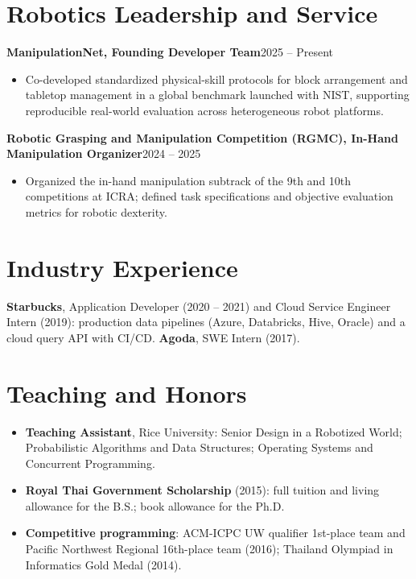 \documentclass[10pt,letterpaper]{article}
\newcommand{\entry}[2]{\textbf{#1}\hfill #2\par}
\begin{document}
\section{Robotics Leadership and Service}
\entry{ManipulationNet, Founding Developer Team}{2025 -- Present}
\begin{itemize}
  \item Co-developed standardized physical-skill protocols for block arrangement and tabletop management in a global
    benchmark launched with NIST, supporting reproducible real-world evaluation across heterogeneous robot platforms.
\end{itemize}
\entry{Robotic Grasping and Manipulation Competition (RGMC), In-Hand Manipulation Organizer}{2024 -- 2025}
\begin{itemize}
  \item Organized the in-hand manipulation subtrack of the 9th and 10th competitions at ICRA; defined task
    specifications and objective evaluation metrics for robotic dexterity.
\end{itemize}

\section{Industry Experience}
\textbf{Starbucks}, Application Developer (2020 -- 2021) and Cloud Service Engineer Intern (2019): production data
pipelines (Azure, Databricks, Hive, Oracle) and a cloud query API with CI/CD. \textbf{Agoda}, SWE Intern (2017).

\section{Teaching and Honors}
\begin{itemize}
  \item \textbf{Teaching Assistant}, Rice University: Senior Design in a Robotized World; Probabilistic Algorithms and
    Data Structures; Operating Systems and Concurrent Programming.
  \item \textbf{Royal Thai Government Scholarship} (2015): full tuition and living allowance for the B.S.; book allowance for the Ph.D.
  \item \textbf{Competitive programming}: ACM-ICPC UW qualifier 1st-place team and Pacific Northwest Regional 16th-place team
    (2016); Thailand Olympiad in Informatics Gold Medal (2014).
\end{itemize}
\end{document}

